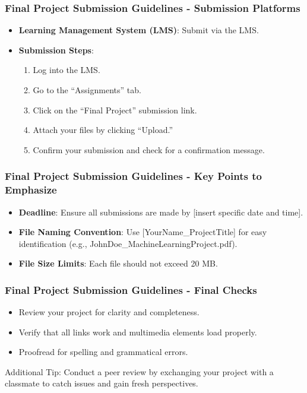 \documentclass[aspectratio=169]{beamer}
\begin{document}
\begin{frame}[fragile]
    \frametitle{Final Project Submission Guidelines - Submission Platforms}
    \begin{itemize}
        \item \textbf{Learning Management System (LMS)}: Submit via the LMS.
        \item \textbf{Submission Steps}:
        \begin{enumerate}
            \item Log into the LMS.
            \item Go to the “Assignments” tab.
            \item Click on the “Final Project” submission link.
            \item Attach your files by clicking “Upload.”
            \item Confirm your submission and check for a confirmation message.
        \end{enumerate}
    \end{itemize}
\end{frame}

\begin{frame}[fragile]
    \frametitle{Final Project Submission Guidelines - Key Points to Emphasize}
    \begin{itemize}
        \item \textbf{Deadline}: Ensure all submissions are made by [insert specific date and time].
        \item \textbf{File Naming Convention}: Use [YourName\_ProjectTitle] for easy identification (e.g., JohnDoe\_MachineLearningProject.pdf).
        \item \textbf{File Size Limits}: Each file should not exceed 20 MB.
    \end{itemize}
\end{frame}

\begin{frame}[fragile]
    \frametitle{Final Project Submission Guidelines - Final Checks}
    \begin{itemize}
        \item Review your project for clarity and completeness.
        \item Verify that all links work and multimedia elements load properly.
        \item Proofread for spelling and grammatical errors.
    \end{itemize}
    \begin{block}{Additional Tip:}
        Conduct a peer review by exchanging your project with a classmate to catch issues and gain fresh perspectives.
    \end{block}
\end{frame}
\end{document}
